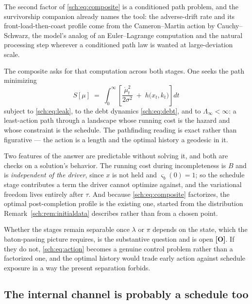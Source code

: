 \begin{remark}
\label{sch:rem:variational}
The second factor of \eqref{sch:eq:composite} is a conditioned path
problem, and the survivorship companion \cite{GoldenSurvivorship} already names the tool: the
adverse-drift rate and its front-load-then-coast profile come from the
Cameron--Martin action by Cauchy--Schwarz, the model's analog of an
Euler--Lagrange computation and the natural processing step wherever a
conditioned path law is wanted at large-deviation scale.

The composite asks for that computation across both stages. One seeks
the path minimizing
\begin{equation}\label{sch:eq:action}
S[\mu]\;=\;\int_0^{\infty}\left[\frac{\dot\mu_t^{2}}{2\sigma^{2}}
\;+\;h\bigl(x_t,k_t\bigr)\right]dt
\end{equation}
subject to \eqref{sch:eq:leak}, to the debt dynamics
\eqref{sch:eq:debt}, and to $\Lambda_\infty<\infty$: a least-action path
through a landscape whose running cost is the hazard and whose
constraint is the schedule. The pathfinding reading is exact rather than
figurative --- the action is a length and the optimal history a geodesic
in it.

Two features of the answer are predictable without solving it, and both
are checks on a solution's behavior. The running cost during
incompleteness is $B$ and is \emph{independent of the driver}, since $x$
is not held and $\varsigma_b(0)=1$; so the schedule stage contributes a
term the driver cannot optimize against, and the variational freedom
lives entirely after $\tau$. And because \eqref{sch:eq:composite}
factorizes, the optimal post-completion profile is the existing one,
started from the distribution Remark~\ref{sch:rem:initialdata}
describes rather than from a chosen point.

Whether the stages remain separable once $\lambda$ or $\pi$ depends on
the state, which the baton-passing picture requires, is the
substantive question and is open \textbf{[O]}. If they do not,
\eqref{sch:eq:action} becomes a genuine control problem rather than a
factorized one, and the optimal history would trade early action against
schedule exposure in a way the present separation forbids.
\end{remark}

\subsection{The internal channel is probably a schedule too}
\label{sch:subsub:internalschedule}

